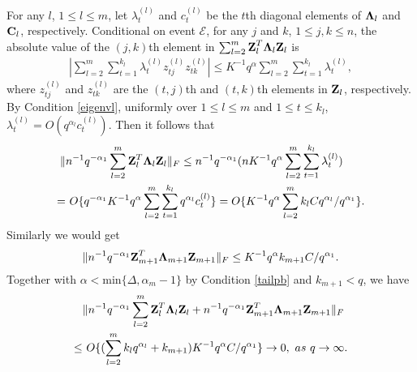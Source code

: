 \documentclass{statsoc}
\newcommand{\bC}{\mbox{\bf C}}
\newcommand{\bZ}{\mbox{\bf Z}}
\newcommand{\bLambda}{\mbox{\boldmath $\Lambda$}}
\def\t{^T}
\begin{document}
For any $l$, $1 \leq l \leq m$, let $\lambda_t^{(l)}$ and $c_t^{(l)}$ be the $t$th diagonal elements of $\bLambda_l$ and $\bC_l$, respectively. Conditional on event $\mathcal{E}$, for any $j$ and $k$, $1 \leq j,k \leq n$, the absolute value of the $(j,k)$th element in $\sum_{l = 2}^{m} \bZ_l\t \bLambda_l \bZ_l$ is
\begin{align*}
|\sum_{l = 2}^{m} \sum_{t = 1}^{k_l} \lambda_t^{(l)} {z_{tj}^{(l)}} z_{tk}^{(l)}| \leq K^{-1} q^{\alpha} \sum_{l = 2}^{m} \sum_{t = 1}^{k_l} \lambda_t^{(l)},
\end{align*}
where ${z_{tj}^{(l)}}$ and $z_{tk}^{(l)}$ are the $(t,j)$th and $(t,k)$th elements in $\bZ_l$, respectively. By Condition \ref{eigenvl}, uniformly over $1 \leq l \leq m$ and $1 \leq t \leq k_l$, $\lambda_t^{(l)} = O(q^{\alpha_l} c_t^{(l)})$. Then it follows that
\begin{align*}
\|&n^{-1}q^{-\alpha_1} \sum_{l = 2}^{m} \bZ_l\t \bLambda_l \bZ_l\|_F \leq n^{-1} q^{-\alpha_1} (n K^{-1} q^{\alpha} \sum_{l = 2}^{m} \sum_{t = 1}^{k_l} \lambda_t^{(l)})\\
= & \ O\{q^{-\alpha_1} K^{-1} q^{\alpha} \sum_{l = 2}^{m} \sum_{t = 1}^{k_l} q^{\alpha_l} c_t^{(l)}\} = O\{K^{-1} q^{\alpha} \sum_{l = 2}^{m} k_l C q^{\alpha_l}/q^{\alpha_1}\}.
\end{align*}
Similarly we would get
\[\|n^{-1}q^{-\alpha_1} \bZ_{m + 1}\t \bLambda_{m + 1} \bZ_{m + 1}\|_F \leq K^{-1} q^{\alpha} k_{m + 1} C/q^{\alpha_1}.\]
Together with $\alpha < \mbox{min}\{\Delta, \alpha_m - 1\}$ by Condition \ref{tailpb} and $k_{m + 1} < q$, we have
\begin{align}\label{Fconv0}
&\|n^{-1}q^{-\alpha_1} \sum_{l = 2}^{m} \bZ_l\t \bLambda_l \bZ_l + n^{-1}q^{-\alpha_1} \bZ_{m + 1}\t \bLambda_{m + 1} \bZ_{m + 1}\|_F \nonumber\\
\leq & \ O\{(\sum_{l = 2}^{m} k_l q^{\alpha_l} + k_{m + 1}) K^{-1} q^{\alpha} C/q^{\alpha_1}\} \to 0, \ as \ q \to \infty.
\end{align}
\end{document}
